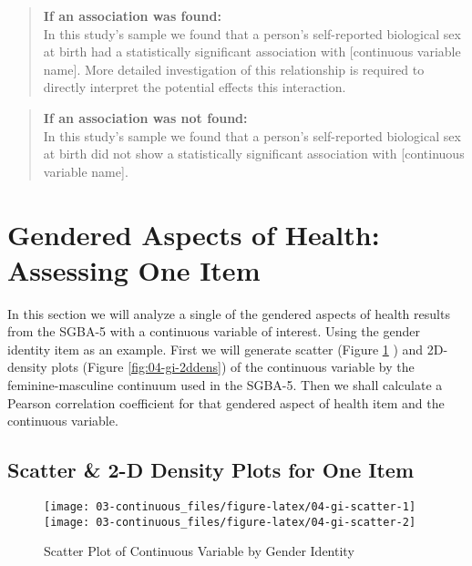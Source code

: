 \documentclass[
]{book}
\begin{document}
\begin{quote}
\textbf{If an association was found:}\\
In this study's sample we found that a person's self-reported biological sex at birth had a statistically significant association with {[}continuous variable name{]}. More detailed investigation of this relationship is required to directly interpret the potential effects this interaction.
\end{quote}

\begin{quote}
\textbf{If an association was not found:}\\
In this study's sample we found that a person's self-reported biological sex at birth did not show a statistically significant association with {[}continuous variable name{]}.
\end{quote}

\section{Gendered Aspects of Health: Assessing One Item}\label{gendered-aspects-of-health-assessing-one-item}

In this section we will analyze a single of the gendered aspects of health results from the SGBA-5 with a continuous variable of interest. Using the gender identity item as an example. First we will generate scatter (Figure \ref{fig:04-gi-scatter} ) and 2D-density plots (Figure \ref{fig:04-gi-2ddens}) of the continuous variable by the feminine-masculine continuum used in the SGBA-5. Then we shall calculate a Pearson correlation coefficient for that gendered aspect of health item and the continuous variable.

\subsection{Scatter \& 2-D Density Plots for One Item}\label{scatter-2-d-density-plots-for-one-item}

\begin{figure}

{\centering \texttt{[image: 03-continuous\_files/figure-latex/04-gi-scatter-1]} \texttt{[image: 03-continuous\_files/figure-latex/04-gi-scatter-2]} 

}

\caption{Scatter Plot of Continuous Variable by Gender Identity}\label{fig:04-gi-scatter}
\end{figure}
\end{document}
